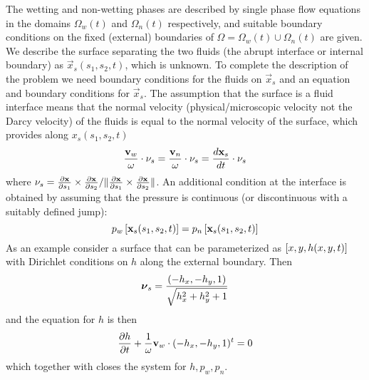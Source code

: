 \documentclass[10pt,dvips,twoside,reqno]{amsart}
\begin{document}
The wetting and non-wetting phases are described by single phase flow
equations in the domains $\Omega_w(t)$ and $\Omega_n(t)$ respectively,
and suitable boundary conditions on the fixed (external) boundaries of
$\Omega = \Omega_w(t) \cup \Omega_n(t)$ are given. We describe the
surface separating the two fluids (the abrupt interface or internal
boundary) as $\vec x_s (s_1,s_2,t)$, which is unknown. To complete the
description of the problem we need boundary conditions for the fluids
on $\vec x_s$ and an equation and boundary conditions for $\vec x_s$.
The assumption that the surface is a fluid interface means that the
normal velocity (physical/microscopic velocity not the Darcy velocity)
of the fluids is equal to the normal velocity of the surface, which
provides along $x_s(s_1,s_2,t)$
\begin{equation}
  \label{eq:normal}
  \frac{{\bf v}_w}{\omega} \cdot \nu_s = \frac{{\bf v}_n}{\omega} \cdot \nu_s = \frac{d {{\bf x}_s}}{d {t}} \cdot \nu_s
\end{equation}
where $\nu_s = \frac{\partial {{\bf x}}}{\partial {s_1}} \times \frac{\partial {{\bf x}}}{\partial {s_2}} / \|\frac{\partial {{\bf x}}}{\partial {s_1}} \times \frac{\partial {{\bf x}}}{\partial {s_2}} \|$. An additional condition at the
interface is obtained by assuming that the pressure is continuous (or
discontinuous with a suitably defined jump):
\begin{equation}
  \label{eq:interfacePressure}
  p_w \left[ {\bf x}_s(s_1,s_2,t) \right] = p_n \left[ {\bf x}_s(s_1,s_2,t) \right]
\end{equation}
As an example consider a surface that can be parameterized as $\left[
x,y,h(x,y,t) \right]$ with Dirichlet conditions on $h$ along the external
boundary. Then
\begin{equation}
  \label{eq:surfNorm}
  \mbox{{\boldmath ${\nu}$}}_s = \frac{(-h_x,-h_y,1)}{\sqrt{h_x^2 + h_y^2 + 1}}
\end{equation}
and the equation for $h$ is then
\begin{equation}
  \label{eq:heq}
  \frac{\partial {h}}{\partial {t}} + \frac{1}{\omega} {\bf v}_w \cdot (-h_x,-h_y,1)^t= 0
\end{equation}
which together with  closes the
system for $h,p_w,p_n$.
\end{document}
